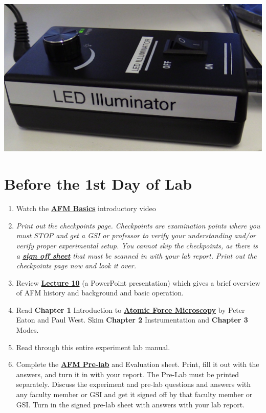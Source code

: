 \documentclass{../lab}
\begin{document}
\href{http://experimentationlab.berkeley.edu/sites/default/files/AFMImages/LED2.jpg}{\includegraphics[width=0.33\linewidth,keepaspectratio]{images/LED2.jpg}}

\section{Before the 1st Day of Lab }

\begin{enumerate}
    \item Watch the \href{http://experimentationlab.berkeley.edu/sites/default/files/Introduction\%20Video\_2.mp4}{\textbf{AFM Basics}} introductory video

    \item \emph{Print out the checkpoints page. Checkpoints are examination points where you must STOP and get a GSI or professor to verify your understanding and/or verify proper experimental setup. You cannot skip the checkpoints, as there is a \href{http://experimentationlab.berkeley.edu/node/136}{\textbf{sign off sheet}} that must be scanned in with your lab report. Print out the checkpoints page now and look it over.}

    \item Review \href{http://experimentationlab.berkeley.edu/sites/default/files/AFMImages/Lecture\_10\_AFM.pdf}{\textbf{Lecture 10}} (a PowerPoint presentation) which gives a brief overview of AFM history and background and basic operation.

    \item Read \textbf{Chapter 1} Introduction to \href{http://experimentationlab.berkeley.edu/afm-book}{\textbf{Atomic Force Microscopy}} by Peter Eaton and Paul West. Skim \textbf{Chapter 2} Instrumentation and \textbf{Chapter 3} Modes.

    \item Read through this entire experiment lab manual.

    \item Complete the \href{http://experimentationlab.berkeley.edu/node/122}{\textbf{AFM Pre-lab}} and Evaluation sheet. Print, fill it out with the answers, and turn it in with your report. The Pre-Lab must be printed separately. Discuss the experiment and pre-lab questions and answers with any faculty member or GSI and get it signed off by that faculty member or GSI. Turn in the signed pre-lab sheet with answers with your lab report.

\end{enumerate}
\end{document}
